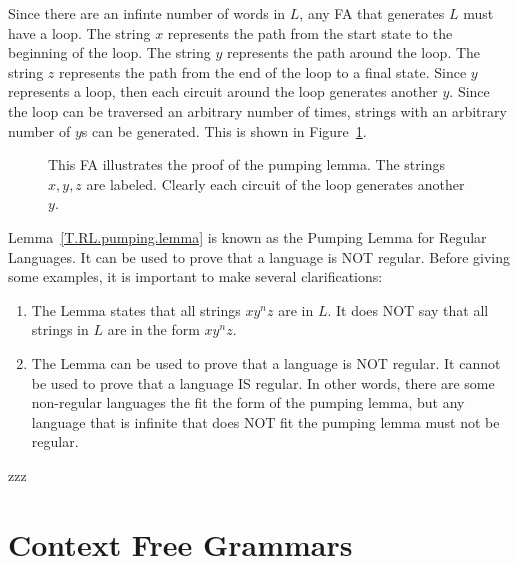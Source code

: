 \documentclass[letterpaper,12pt,openany,reqno]{book}%
\newcommand{\fanonterminalnode}[2] {\node at (#1) (#2) [circle, draw, minimum size=24pt] {#2};}
\newcommand{\fatransition}[3] {\draw [-{Latex[length=3mm,width=2.5mm]}] (#1) -- (#2) node [midway, above] {#3};}
\newcommand{\faarctransition}[5] {\draw [-{Latex[length=3mm,width=2.5mm]}] (#1) to[out=#4, in=#5] node  [midway, above] {#3} (#2) ;}
\begin{document}
Since there are an infinte number of words in $L$, any FA that generates $L$ must have a loop. The string $x$ represents the path from the start state to the beginning of the loop. The string $y$ represents the path around the loop. The string $z$ represents the path from the end of the loop to a final state. Since $y$ represents a loop, then each circuit around the loop generates another $y$. Since the loop can be traversed an arbitrary number of times, strings with an arbitrary number of $y$s can be generated. This is shown in Figure~\ref{F.RL.pumping.lemma}.

\begin{figure}[hbt]
\centering
{}
\caption[FA illustrating the pumping lemma]{This FA illustrates the proof of the pumping lemma. The strings $x,y,z$ are labeled. Clearly each circuit of the loop generates another $y$.}
\label{F.RL.pumping.lemma}
\end{figure}


Lemma~\ref{T.RL.pumping.lemma} is known as the Pumping Lemma for Regular Languages. It can be used to prove that a language is NOT regular. Before giving some examples, it is important to make several clarifications:
\begin{enumerate}
\item The Lemma states that all strings $x y^n z$ are in $L$. It does NOT say that all strings in $L$ are in the form $x y^n z$.
\item The Lemma can be used to prove that a language is NOT regular. It cannot be used to prove that a language IS regular. In other words, there are some non-regular languages the fit the form of the pumping lemma, but any language that is infinite that does NOT fit the pumping lemma must not be regular.
\end{enumerate}

zzz
\part{Context Free Grammars}
\end{document}

